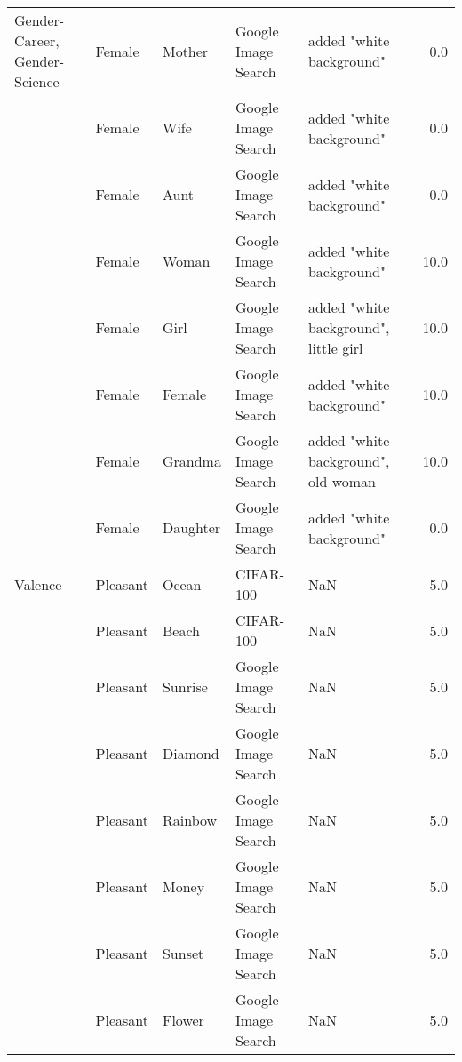 \begin{tabular}{lllllr}
Gender-Career, Gender-Science & Female &             Mother &  Google Image Search &                           added "white background" &   0.0 \\
     & Female &               Wife &  Google Image Search &                           added "white background" &   0.0 \\
     & Female &               Aunt &  Google Image Search &                           added "white background" &   0.0 \\
     & Female &              Woman &  Google Image Search &                           added "white background" &  10.0 \\
     & Female &               Girl &  Google Image Search &              added "white background", little girl &  10.0 \\
     & Female &             Female &  Google Image Search &                           added "white background" &  10.0 \\
     & Female &            Grandma &  Google Image Search &                added "white background", old woman &  10.0 \\
     & Female &           Daughter &  Google Image Search &                           added "white background" &   0.0 \\
Valence & Pleasant &              Ocean &            CIFAR-100 &                                                NaN &   5.0 \\
     & Pleasant &              Beach &            CIFAR-100 &                                                NaN &   5.0 \\
     & Pleasant &            Sunrise &  Google Image Search &                                                NaN &   5.0 \\
     & Pleasant &            Diamond &  Google Image Search &                                                NaN &   5.0 \\
     & Pleasant &            Rainbow &  Google Image Search &                                                NaN &   5.0 \\
     & Pleasant &              Money &  Google Image Search &                                                NaN &   5.0 \\
     & Pleasant &             Sunset &  Google Image Search &                                                NaN &   5.0 \\
     & Pleasant &             Flower &  Google Image Search &                                                NaN &   5.0 \\

\end{tabular}
